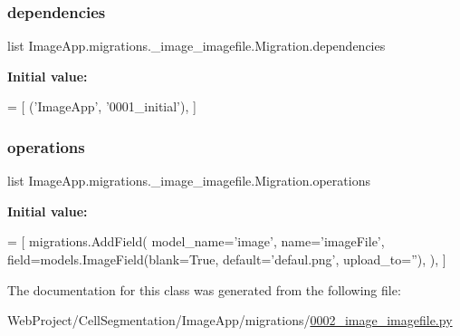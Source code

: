 \subsubsection{\texorpdfstring{dependencies}{dependencies}}
{\footnotesize\ttfamily list Image\+App.\+migrations.\+\_\+image\+\_\+imagefile.\+Migration.\+dependencies\hspace{0.3cm}{\ttfamily [static]}}

{\bfseries Initial value\+:}
\begin{DoxyCode}
=  [
        (\textcolor{stringliteral}{'ImageApp'}, \textcolor{stringliteral}{'0001\_initial'}),
    ]
\end{DoxyCode}
\mbox{\label{class_image_app_1_1migrations_1_10002__image__imagefile_1_1_migration_a69c49e7f79f172c63206a38fb765d519}} 
\subsubsection{\texorpdfstring{operations}{operations}}
{\footnotesize\ttfamily list Image\+App.\+migrations.\+\_\+image\+\_\+imagefile.\+Migration.\+operations\hspace{0.3cm}{\ttfamily [static]}}

{\bfseries Initial value\+:}
\begin{DoxyCode}
=  [
        migrations.AddField(
            model\_name=\textcolor{stringliteral}{'image'},
            name=\textcolor{stringliteral}{'imageFile'},
            field=models.ImageField(blank=\textcolor{keyword}{True}, default=\textcolor{stringliteral}{'defaul.png'}, upload\_to=\textcolor{stringliteral}{''}),
        ),
    ]
\end{DoxyCode}


The documentation for this class was generated from the following file\+:\begin{DoxyCompactItemize}
\item 
Web\+Project/\+Cell\+Segmentation/\+Image\+App/migrations/\mbox{\hyperlink{0002__image__imagefile_8py}{0002\+\_\+image\+\_\+imagefile.\+py}}\end{DoxyCompactItemize}
